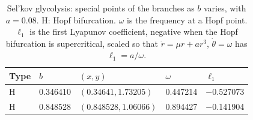 \begin{table}
\centering
\caption{Sel'kov glycolysis: special points of the branches as $b$ varies, with $a = 0.08$. H: Hopf bifurcation. $\omega$ is the frequency at a Hopf point. $\ell_1$ is the first Lyapunov coefficient, negative when the Hopf bifurcation is supercritical, scaled so that $\dot r = \mu r + a r^3$, $\dot\theta = \omega$ has $\ell_1 = a/\omega$.}
\label{tab:sel-kov-glycolysis-special-points}
\begin{tabular}{@{}lllll@{}}
\toprule
Type & $b$ & $(x, y)$ & $\omega$ & $\ell_1$ \\
\midrule
H & \num{0.346410} & $(\num{0.34641}, \num{1.73205})$ & \num{0.447214} & \num{-0.527073} \\
H & \num{0.848528} & $(\num{0.848528}, \num{1.06066})$ & \num{0.894427} & \num{-0.141904} \\
\bottomrule
\end{tabular}
\end{table}
